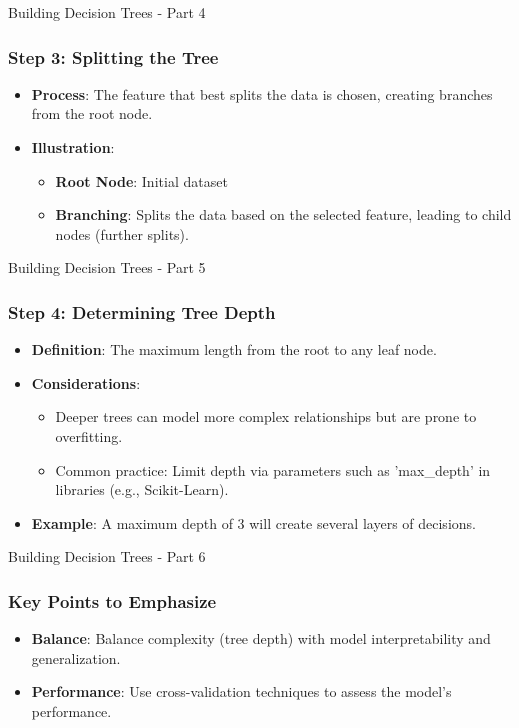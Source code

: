 \documentclass[aspectratio=169]{beamer}
\begin{document}
\begin{frame}[fragile]{Building Decision Trees - Part 4}
    \frametitle{Step 3: Splitting the Tree}
    \begin{itemize}
        \item \textbf{Process}: The feature that best splits the data is chosen, creating branches from the root node.
        \item \textbf{Illustration}:
        \begin{itemize}
            \item \textbf{Root Node}: Initial dataset
            \item \textbf{Branching}: Splits the data based on the selected feature, leading to child nodes (further splits).
        \end{itemize}
    \end{itemize}
\end{frame}

\begin{frame}[fragile]{Building Decision Trees - Part 5}
    \frametitle{Step 4: Determining Tree Depth}
    \begin{itemize}
        \item \textbf{Definition}: The maximum length from the root to any leaf node.
        \item \textbf{Considerations}:
        \begin{itemize}
            \item Deeper trees can model more complex relationships but are prone to overfitting.
            \item Common practice: Limit depth via parameters such as 'max\_depth' in libraries (e.g., Scikit-Learn).
        \end{itemize}
        \item \textbf{Example}: A maximum depth of 3 will create several layers of decisions.
    \end{itemize}
\end{frame}

\begin{frame}[fragile]{Building Decision Trees - Part 6}
    \frametitle{Key Points to Emphasize}
    \begin{itemize}
        \item \textbf{Balance}: Balance complexity (tree depth) with model interpretability and generalization.
        \item \textbf{Performance}: Use cross-validation techniques to assess the model's performance.
    \end{itemize}
\end{frame}
\end{document}
